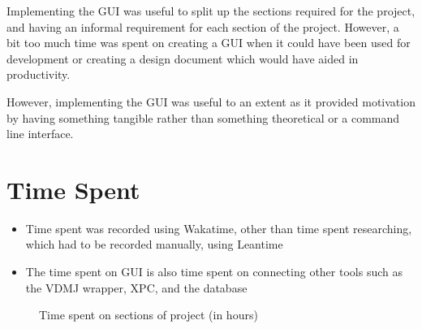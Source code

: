 \documentclass[../dissertation.tex]{subfiles}
\begin{document}
Implementing the GUI was useful to split up the sections required for the project,
and having an informal requirement for each section of the project.
However, a bit too much time was spent on creating a GUI when it could have been
used for development or creating a design document which would have aided in
productivity.

However, implementing the GUI was useful to an extent as it provided motivation
by having something tangible rather than something theoretical or a command line interface.


\section{Time Spent}
\begin{itemize}
  \item Time spent was recorded using Wakatime, other than time spent
    researching, which had to be recorded manually, using Leantime
  \item The time spent on GUI is also time spent on connecting other tools
    such as the VDMJ wrapper, XPC, and the database
\end{itemize}
\begin{figure}[!htp]
  \centering
  \caption{Time spent on sections of project (in hours)}
\end{figure}
\end{document}
